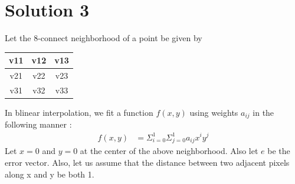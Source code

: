 \documentclass[a4paper,fleqn,11pt]{article}
\theoremstyle{mytheor}
\begin{document}
\section*{Solution 3}
Let the 8-connect neighborhood of a point be given by
\begin{tabular}{| c | c | c |}
	\hline
	v11	& v12 & v13 \\
	\hline
	v21 & v22 & v23 \\
	\hline
	v31 & v32 & v33 \\
	\hline
\end{tabular}
In blinear interpolation, we fit a function $f(x, y)$ using weights $a_{ij}$ in the following manner :
\begin{align}
f(x, y) & = \Sigma_{i = 0}^1\Sigma_{j = 0}^1 a_{ij}x^i y^j
\end{align}
Let $x = 0$ and $y = 0$ at the center of the above neighborhood. Also let $e$ be the error vector. Also, let us assume that the distance between two adjacent pixels along x and y be both 1.
\end{document}
